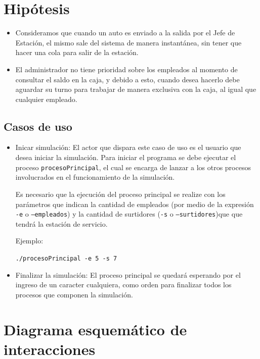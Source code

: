 \documentclass[12pt,a4paper,spanish]{article}
\begin{document}
\section{Hipótesis}

\begin{itemize}
	\item Consideramos que cuando un auto es enviado a la salida por el Jefe de Estación,
	el mismo sale del sistema de manera instantánea, sin tener que hacer una cola
	para salir de la estación.

	\item El administrador no tiene prioridad sobre los empleados al momento de consultar
	el saldo en la caja, y debido a esto, cuando desea hacerlo debe aguardar su turno para
	trabajar de manera exclusiva con la caja, al igual que cualquier empleado.
\end{itemize}

\subsection{Casos de uso}

\begin{itemize}
	\item Inicar simulación: El actor que dispara este caso de uso es el usuario
	que desea iniciar la simulación. Para iniciar el programa se debe ejecutar el
	proceso \texttt{procesoPrincipal}, el cual se encarga de
	lanzar a los otros procesos involucrados en el funcionamiento de la simulación.

	Es necesario que la ejecución del proceso principal se realize con los parámetros
	que indican la cantidad de empleados (por medio de la expresión \texttt{-e} o \texttt{--empleados})
	y la cantidad de surtidores (\texttt{-s} o \texttt{--surtidores})que que tendrá la
	estación de servicio.

	Ejemplo:

	\texttt{./procesoPrincipal -e 5 -s 7}

	\item Finalizar la simulación: El proceso principal se quedará esperando por el 
	ingreso de un caracter cualquiera, como orden para finalizar todos los procesos
	que componen la simulación.

\end{itemize}


	\section{Diagrama esquemático de interacciones}
	
\end{document}
